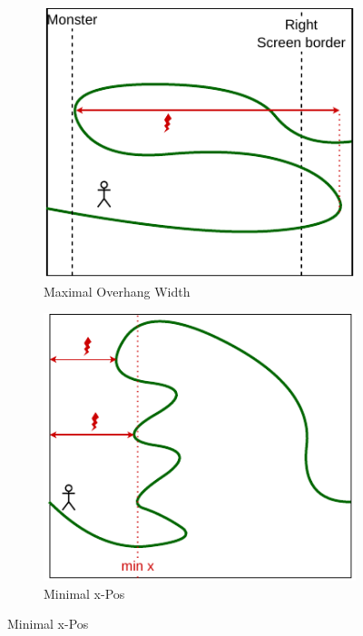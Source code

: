 \begin{figure}[htbp]
  \vspace{.5cm}
  \begin{subfigure}{.5\linewidth}
    \centering
    \includegraphics[width=.948\linewidth]{figures/constraints/MaximalOverhangWidth.pdf}
    \caption{Maximal Overhang Width}
    \label{pic:maximalOverhangWidth}
  \end{subfigure}%
  \begin{subfigure}{.5\linewidth}
    \centering
    \includegraphics[width=.96\linewidth]{figures/constraints/MinimalXPos.pdf}
    \caption{Minimal x-Pos}
    \label{pic:minimalXPos}
  \end{subfigure}


\end{figure}
